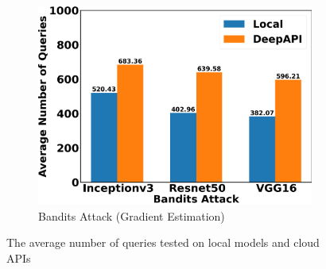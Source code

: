 \begin{figure}[tbp]
\begin{subfigure}[b]{0.6\textwidth}
    \centering
    \includegraphics[width=\textwidth]{figures/chapter_classification/bandits_number_of_queries.png}
    \caption{Bandits Attack (Gradient Estimation)}
    \label{fig:bandits_queries}
\end{subfigure}
\caption{The average number of queries tested on local models and cloud APIs}
\label{fig.queries}
\end{figure}

